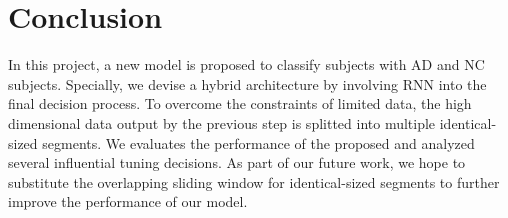 \section{Conclusion}

In this project, a new model is proposed to classify subjects with AD and NC subjects. Specially, we devise a hybrid architecture by involving RNN into the final decision process. To overcome the constraints of limited data, the high dimensional data output by the previous step is splitted into multiple identical-sized segments. We evaluates the performance of the proposed and analyzed several influential tuning decisions. As part of our future work, we hope to substitute the overlapping sliding window for identical-sized segments to further improve the performance of our model.

% 
%
% 
% 
% 
% 
% 
% 
% 
%
